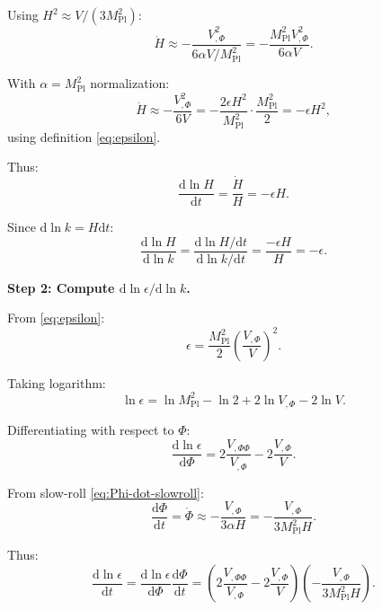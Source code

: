 \documentclass[11pt,a4paper]{article}
\numberwithin{equation}{section}
\theoremstyle{plain}
\theoremstyle{definition}
\theoremstyle{remark}
\newcommand{\dd}{\mathrm{d}}
\begin{document}
Using $H^2 \approx V/(3M_{\mathrm{Pl}}^2)$:
\begin{equation}
\dot{H} \approx -\frac{V_{,\Phi}^2}{6\alpha V/M_{\mathrm{Pl}}^2} = -\frac{M_{\mathrm{Pl}}^2 V_{,\Phi}^2}{6\alpha V}.
\end{equation}

With $\alpha = M_{\mathrm{Pl}}^2$ normalization:
\begin{equation}
\dot{H} \approx -\frac{V_{,\Phi}^2}{6V} = -\frac{2\epsilon H^2}{M_{\mathrm{Pl}}^2}\cdot\frac{M_{\mathrm{Pl}}^2}{2} = -\epsilon H^2,
\end{equation}
using definition \eqref{eq:epsilon}.

Thus:
\begin{equation}
\frac{\dd\ln H}{\dd t} = \frac{\dot{H}}{H} = -\epsilon H.
\end{equation}

Since $\dd\ln k = H\dd t$:
\begin{equation}
\frac{\dd\ln H}{\dd\ln k} = \frac{\dd\ln H/\dd t}{\dd\ln k/\dd t} = \frac{-\epsilon H}{H} = -\epsilon.
\label{eq:dlnH-dlnk}
\end{equation}

\textbf{Step 2: Compute $\dd\ln\epsilon/\dd\ln k$.}

From \eqref{eq:epsilon}:
\begin{equation}
\epsilon = \frac{M_{\mathrm{Pl}}^2}{2}\left(\frac{V_{,\Phi}}{V}\right)^2.
\end{equation}

Taking logarithm:
\begin{equation}
\ln\epsilon = \ln M_{\mathrm{Pl}}^2 - \ln 2 + 2\ln V_{,\Phi} - 2\ln V.
\end{equation}

Differentiating with respect to $\Phi$:
\begin{equation}
\frac{\dd\ln\epsilon}{\dd\Phi} = 2\frac{V_{,\Phi\Phi}}{V_{,\Phi}} - 2\frac{V_{,\Phi}}{V}.
\end{equation}

From slow-roll \eqref{eq:Phi-dot-slowroll}:
\begin{equation}
\frac{\dd\Phi}{\dd t} = \dot{\Phi} \approx -\frac{V_{,\Phi}}{3\alpha H} = -\frac{V_{,\Phi}}{3M_{\mathrm{Pl}}^2 H}.
\end{equation}

Thus:
\begin{equation}
\frac{\dd\ln\epsilon}{\dd t} = \frac{\dd\ln\epsilon}{\dd\Phi}\frac{\dd\Phi}{\dd t} = \left(2\frac{V_{,\Phi\Phi}}{V_{,\Phi}} - 2\frac{V_{,\Phi}}{V}\right)\left(-\frac{V_{,\Phi}}{3M_{\mathrm{Pl}}^2 H}\right).
\end{equation}
\end{document}
